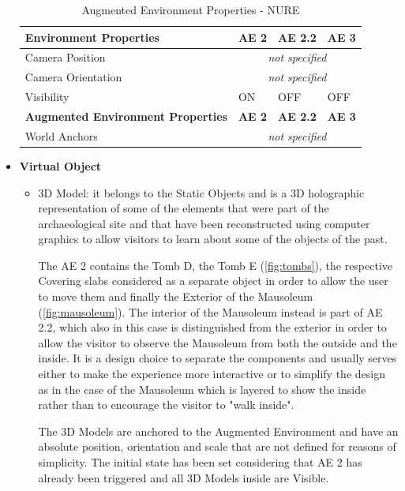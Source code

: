 \begin{itemize}
\begin{itemize}
    \end{itemize}
    \begin{table}[h]
    \centering
    \begin{tabular}{|l|l|l|l|}
    \hline
    \textbf{Environment Properties}           & \textbf{AE 2} & \textbf{AE 2.2} & \textbf{AE 3} \\ \hline
    Camera Position    & \multicolumn{3}{c|}{\textit{not specified}} \\ \hline
    Camera Orientation & \multicolumn{3}{c|}{\textit{not specified}} \\ \hline
    Visibility         & ON           & OFF           & OFF          \\ \hline
    \textbf{Augmented Environment Properties} & \textbf{AE 2} & \textbf{AE 2.2} & \textbf{AE 3} \\ \hline
    World Anchors      & \multicolumn{3}{c|}{\textit{not specified}} \\ \hline
    \end{tabular}
    \caption{Augmented Environment Properties - NURE}
    \label{tab:NUREAEproperties}
    \end{table}
    \item \textbf{Virtual Object}
    \begin{itemize}
        \item 3D Model: it belongs to the Static Objects and is a 3D holographic representation of some of the elements that were part of the archaeological site and that have been reconstructed using computer graphics to allow visitors to learn about some of the objects of the past. 
        
        The AE 2 contains the Tomb D, the Tomb E (\autoref{fig:tombs}), the respective Covering slabs considered as a separate object in order to allow the user to move them and finally the Exterior of the Mausoleum (\autoref{fig:mausoleum}). The interior of the Mausoleum instead is part of AE 2.2, which also in this case is distinguished from the exterior in order to allow the visitor to observe the Mausoleum from both the outside and the inside. It is a design choice to separate the components and usually serves either to make the experience more interactive or to simplify the design as in the case of the Mausoleum which is layered to show the inside rather than to encourage the visitor to "walk inside".
        
        The 3D Models are anchored to the Augmented Environment and have an absolute position, orientation and scale that are not defined for reasons of simplicity. The initial state has been set considering that AE 2 has already been triggered and all 3D Models inside are Visible. 
        

\end{itemize}
\end{itemize}
